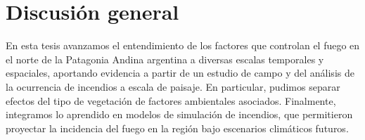 \newpage{\ }
\cleardoublepage

\chapter[Capítulo 5. Discusión general]{Discusión general}\label{cap:discu}

En esta tesis avanzamos el entendimiento de los factores que controlan el fuego en el norte de la Patagonia Andina argentina a diversas escalas temporales y espaciales, aportando evidencia a partir de un estudio de campo y del análisis de la ocurrencia de incendios a escala de paisaje. En particular, pudimos separar efectos del tipo de vegetación de factores ambientales asociados. Finalmente, integramos lo aprendido en modelos de simulación de incendios, que permitieron proyectar la incidencia del fuego en la región bajo escenarios climáticos futuros. 

